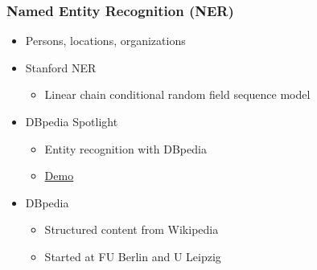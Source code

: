 \begin{frame}
    \frametitle{Named Entity Recognition (NER)}
\begin{itemize}
\item Persons, locations, organizations
\end{itemize}

\begin{itemize}
\item Stanford NER
\begin{itemize}
\item Linear chain conditional random field sequence model
\end{itemize}
\end{itemize}

\begin{itemize}
\item DBpedia Spotlight
\begin{itemize}
\item Entity recognition with DBpedia
\item \textcolor{iseblue}{\href{http://demo.dbpedia-spotlight.org/}{Demo}}
\end{itemize}
\end{itemize}

\begin{itemize}
\item DBpedia
\begin{itemize}
\item Structured content from Wikipedia
\item Started at FU Berlin and U Leipzig
\end{itemize}
\end{itemize}

\end{frame}

